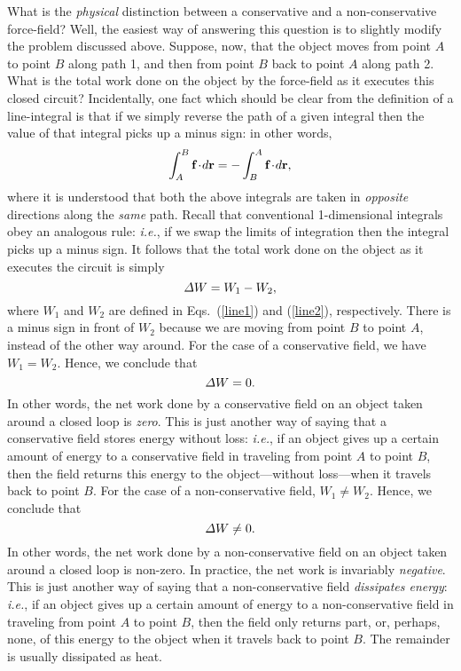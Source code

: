 What is the {\em physical} distinction between a conservative and a non-conservative
force-field? Well, the easiest way of answering this question is to
slightly modify the problem discussed above. Suppose, now, that  the object moves from
point $A$ to point $B$ along path 1, and then from point $B$ back to point $A$
along path 2. What is the total work done on the object by the force-field as
it executes this closed circuit? Incidentally, one fact which should be clear from the
definition of a line-integral is that if we simply reverse the path of a given
integral then the value of that integral picks up a minus sign: in other
words,
\begin{equation}
\int_A^B {\bf f}\!\cdot\!d{\bf r} = - \int_B^A {\bf f}\!\cdot\!d{\bf r},
\end{equation}
where it is understood that both the above integrals are taken in {\em opposite} directions
along the {\em same} path. Recall that conventional 1-dimensional integrals
obey an analogous rule: {\em i.e.}, if we swap the limits of
integration then the integral picks up a minus sign. 
It follows that the total work done on the object as it executes
the circuit is simply
\begin{equation}
{\mit\Delta}W = W_1 - W_2,
\end{equation}
where $W_1$ and $W_2$ are defined in Eqs.~(\ref{line1}) and (\ref{line2}), respectively.
There is a minus sign in front of $W_2$ because we are moving from point $B$ to point
$A$, instead of the other way around. For the case of a conservative field, we have
$W_1=W_2$. Hence, we conclude that
\begin{equation}
{\mit\Delta}W = 0.
\end{equation}
In other words, the net work done by a conservative field on an object taken around
a closed loop is {\em zero}. This is just another way of saying that a conservative
field stores energy without loss: {\em i.e.}, if an object gives up a
certain amount of energy to a conservative field in traveling from point $A$ to point $B$, then the
field returns this energy to the object---without loss---when it travels back
to point $B$. For the case of a non-conservative field, $W_1\neq W_2$. Hence, we
conclude that
\begin{equation}
{\mit\Delta}W \neq 0.
\end{equation}
In other words, the net work done by a non-conservative field on an object taken around
a closed loop is non-zero. In practice, the net work is invariably {\em negative}. 
This is just another way of saying that a non-conservative field {\em dissipates energy}: 
{\em i.e.}, if an object gives up a
certain amount of energy to a non-conservative field in traveling from point $A$ to point $B$, then the
field only returns part, or, perhaps, none, of this energy to the object when it travels back
to point $B$. The remainder is usually dissipated as heat.

